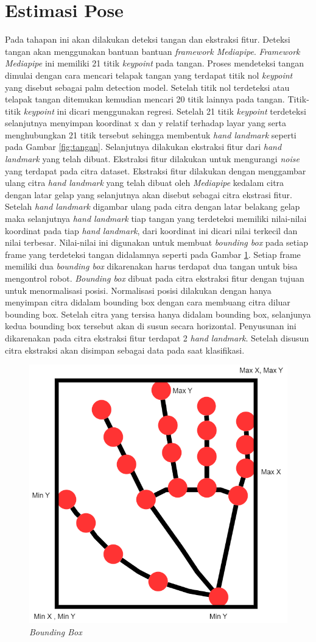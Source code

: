 \section{Estimasi Pose}
Pada tahapan ini akan dilakukan deteksi tangan dan ekstraksi fitur. Deteksi tangan akan menggunakan bantuan bantuan \emph{framework Mediapipe}. \emph{Framework Mediapipe} ini memiliki 21 titik  \emph{keypoint} pada tangan. Proses mendeteksi tangan dimulai dengan cara mencari telapak tangan yang terdapat titik nol \emph{keypoint} yang disebut sebagai palm detection model. Setelah titik nol terdeteksi atau telapak tangan ditemukan kemudian mencari 20 titik lainnya pada tangan. Titik-titik \emph{keypoint} ini dicari menggunakan regresi. Setelah 21 titik \emph{keypoint} terdeteksi selanjutnya menyimpan koordinat x dan y relatif terhadap layar yang serta menghubungkan 21 titik tersebut sehingga membentuk \emph{hand landmark} seperti pada Gambar \ref{fig:tangan}. Selanjutnya dilakukan ekstraksi fitur dari \emph{hand landmark} yang telah dibuat. Ekstraksi fitur dilakukan untuk mengurangi \emph{noise} yang terdapat pada citra dataset. Ekstraksi fitur dilakukan dengan menggambar ulang citra \emph{hand landmark} yang telah dibuat oleh \emph{Mediapipe} kedalam citra dengan latar gelap yang selanjutnya akan disebut sebagai citra ekstrasi fitur. Setelah \emph{hand landmark} digambar ulang pada citra dengan latar belakang gelap maka selanjutnya \emph{hand landmark} tiap tangan yang terdeteksi memiliki nilai-nilai koordinat pada tiap \emph{hand landmark}, dari koordinat ini dicari nilai terkecil dan nilai terbesar.  Nilai-nilai ini digunakan untuk membuat \emph{bounding box} pada setiap frame yang terdeteksi tangan didalamnya seperti pada Gambar \ref{fig:boundingbox}. Setiap frame memiliki dua \emph{bounding box} dikarenakan harus terdapat dua tangan untuk bisa mengontrol robot. \emph{Bounding box} dibuat pada citra ekstraksi fitur dengan tujuan untuk menormalisasi posisi. Normalisasi posisi dilakukan dengan hanya menyimpan citra didalam bounding box dengan cara membuang citra diluar bounding box. Setelah citra yang tersisa hanya didalam bounding box, selanjunya kedua bounding box tersebut akan di susun secara horizontal. Penyusunan ini dikarenakan pada citra ekstraksi fitur terdapat 2 \emph{hand landmark}. Setelah disusun citra ekstraksi akan disimpan sebagai data pada saat klasifikasi.

\begin{figure}
  \centering
  \includegraphics[width=0.5\linewidth]{../Gambar/boundingbox.png}
  \caption{\emph{Bounding Box}}
  \label{fig:boundingbox}
\end{figure}

